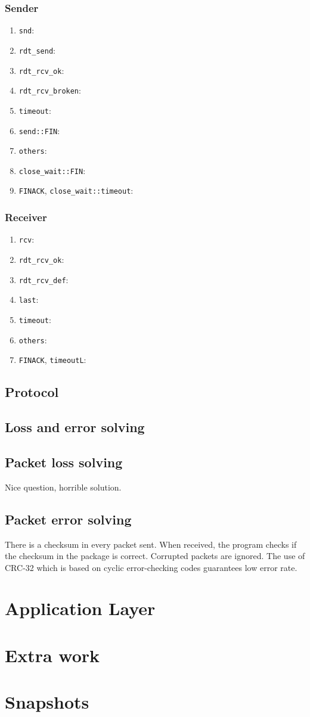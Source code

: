 \documentclass[10pt,a4paper]{article}
\begin{document}
    \subsubsection{Sender}
    \begin{enumerate}
    	\item \texttt{snd}:
        \item \texttt{rdt\_send}:
        \item \texttt{rdt\_rcv\_ok}:
        \item \texttt{rdt\_rcv\_broken}:
        \item \texttt{timeout}:
        \item \texttt{send::FIN}:
        \item \texttt{others}:
        \item \texttt{close\_wait::FIN}:
        \item \texttt{FINACK}, \texttt{close\_wait::timeout}:
    \end{enumerate}
    \subsubsection{Receiver}
    \begin{enumerate}
        \item \texttt{rcv}:
        \item \texttt{rdt\_rcv\_ok}:
        \item \texttt{rdt\_rcv\_def}:
        \item \texttt{last}:
        \item \texttt{timeout}:
        \item \texttt{others}:
        \item \texttt{FINACK}, \texttt{timeoutL}:
    \end{enumerate}
\subsection{Protocol}
\subsection{Loss and error solving}
    \subsection{Packet loss solving}
        Nice question, horrible solution.
    \subsection{Packet error solving}
        There is a checksum in every packet sent. When received, the program checks if the checksum in the package is correct. Corrupted packets are ignored. The use of CRC-32 which is based on cyclic error-checking codes guarantees low error rate.

\section{Application Layer}
\section{Extra work}
\section{Snapshots}
\end{document}
